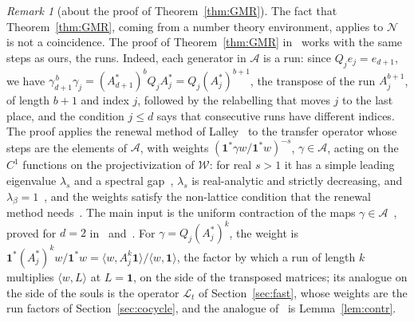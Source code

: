 \documentclass[11pt]{amsart}
\theoremstyle{definition}
\theoremstyle{remark}
\newtheorem{remark}[proposition]{Remark}
\newcommand{\one}{\mathbf 1}
\newcommand{\cN}{\mathcal N}
\newcommand{\cL}{\mathcal L}
\newcommand{\pr}[1]{\langle #1\rangle}
\begin{document}
\begin{remark}[about the proof of Theorem~\ref{thm:GMR}]\label{rem:GMRproof}
The fact that Theorem~\ref{thm:GMR}, coming from a number theory environment, applies to $\cN$ is not a coincidence.
The proof of Theorem~\ref{thm:GMR} in~\cite{GMR19} works with the same steps as ours, the runs. Indeed, each generator in $\mathcal A$ is a run: since $Q_je_j=e_{d+1}$, we have $\gamma_{d+1}^{\,b}\gamma_j=(A_{d+1}^*)^bQ_jA_j^*=Q_j(A_j^*)^{b+1}$, the transpose of the run $A_j^{b+1}$, of length $b+1$ and index $j$, followed by the relabelling that moves $j$ to the last place, and the condition $j\le d$ says that consecutive runs have different indices. The proof applies the renewal method of Lalley~\cite{Lal89} to the transfer operator whose steps are the elements of $\mathcal A$, with weights $(\one^*\gamma w/\one^*w)^{-s}$, $\gamma\in\mathcal A$, acting on the $C^1$ functions on the projectivization of $\mathcal W$: for real $s>1$ it has a simple leading eigenvalue $\lambda_s$ and a spectral gap~\cite[Thm.~39]{GMR19}, $\lambda_s$ is real-analytic and strictly decreasing, and $\lambda_\beta=1$~\cite[Prop.~43 and \S4.3]{GMR19}, and the weights satisfy the non-lattice condition that the renewal method needs~\cite[Prop.~42]{GMR19}. The main input is the uniform contraction of the maps $\gamma\in\mathcal A$~\cite[Prop.~45]{GMR19}, proved for $d=2$ in~\cite[Lemma~2]{AS13} and~\cite[Lemma~13]{AHS16}. For $\gamma=Q_j(A_j^*)^k$, the weight is $\one^*(A_j^*)^kw/\one^*w=\pr{w,A_j^k\one}/\pr{w,\one}$, the factor by which a run of length $k$ multiplies $\pr{w,L}$ at $L=\one$, on the side of the transposed matrices; its analogue on the side of the souls is the operator $\cL_t$ of Section~\ref{sec:fast}, whose weights are the run factors of Section~\ref{sec:cocycle}, and the analogue of~\cite[Prop.~45]{GMR19} is Lemma~\ref{lem:contr}.
\end{remark}
\end{document}
